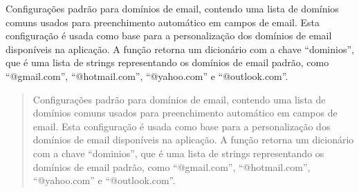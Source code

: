 \documentclass[letterpaper,10pt,english]{sphinxmanual}
\begin{document}
\begin{fulllineitems}
\label{\detokenize{api/config:config.default_email_domains_config}}
\pysigstartsignatures
\pysiglinewithargsret
{}
{}
{}
\pysigstopsignatures
\sphinxAtStartPar
Configurações padrão para domínios de email, contendo uma lista de domínios comuns usados para preenchimento automático em campos de email. Esta configuração é usada como base para a personalização dos domínios de email disponíveis na aplicação. A função retorna um dicionário com a chave “dominios”, que é uma lista de strings representando os domínios de email padrão, como “@gmail.com”, “@hotmail.com”, “@yahoo.com” e “@outlook.com”.
\begin{quote}\begin{description}
\sphinxAtStartPar
Configurações padrão para domínios de email, contendo uma lista de domínios comuns usados para preenchimento automático em campos de email. Esta configuração é usada como base para a personalização dos domínios de email disponíveis na aplicação. A função retorna um dicionário com a chave “dominios”, que é uma lista de strings representando os domínios de email padrão, como “@gmail.com”, “@hotmail.com”, “@yahoo.com” e “@outlook.com”.

\sphinxAtStartPar
{}

\end{description}\end{quote}

\end{fulllineitems}

\end{document}
